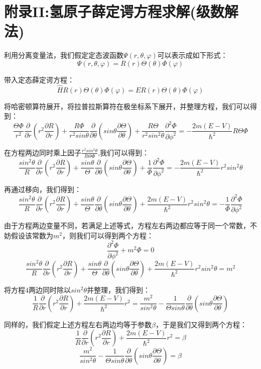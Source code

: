 \section{附录II:氢原子薛定谔方程求解(级数解法)\label{hydrgen}}
利用分离变量法，我们假定定态波函数$\varPsi(r,\theta,\varphi)$可以表示成如下形式：
\[\varPsi(r,\theta,\varphi)=R(r)\Theta(\theta)\varPhi(\varphi)\]

带入定态薛定谔方程：
\[\hat{H}R(r)\Theta(\theta)\varPhi(\varphi)=ER(r)\Theta(\theta)\varPhi(\varphi)\]

将哈密顿算符展开，将拉普拉斯算符在极坐标系下展开，并整理方程，我们可以得到：
\[\frac{\Theta\varPhi}{r^2}\frac{\partial}{\partial{r}}(r^2\frac{\partial R}{\partial{r}})+\frac{R\varPhi}{r^2sin\theta}\frac{\partial}{\partial{\theta}}(sin\theta\frac{\partial \Theta}{\partial{\theta}})+\frac{R\Theta}{r^2sin^2 \theta }\frac{\partial^2 \varPhi}{\partial{\phi^2}}=-\frac{2m(E-V)}{\hbar^2}R\Theta\varPhi\]

在方程两边同时乘上因子$\frac{r^2sin^2 \theta}{R\Theta\varPhi}$,我们可以得到：
\[\frac{sin^2 \theta}{R}\frac{\partial}{\partial{r}}(r^2\frac{\partial R}{\partial{r}})+\frac{sin\theta}{\Theta}\frac{\partial}{\partial{\theta}}(sin\theta\frac{\partial \Theta}{\partial{\theta}})+\frac{1}{\varPhi}\frac{\partial^2 \varPhi}{\partial{\phi^2}}=-\frac{2m(E-V)}{\hbar^2}r^2sin^2 \theta\]

再通过移向，我们得到：
\[\frac{sin^2 \theta}{R}\frac{\partial}{\partial{r}}(r^2\frac{\partial R}{\partial{r}})+\frac{sin\theta}{\Theta}\frac{\partial}{\partial{\theta}}(sin\theta\frac{\partial \Theta}{\partial{\theta}})+\frac{2m(E-V)}{\hbar^2}r^2sin^2 \theta=-\frac{1}{\varPhi}\frac{\partial^2 \varPhi}{\partial{\phi^2}}\]

由于方程两边变量不同，若满足上述等式，方程左右两边都应等于同一个常数，不妨假设该常数为$m^2$，则我们可以得到两个方程：
\[\frac{\partial^2 \varPhi}{\partial{\phi^2}}+m^2\varPhi=0 \tag{a}\]
\[\frac{sin^2 \theta}{R}\frac{\partial}{\partial{r}}(r^2\frac{\partial R}{\partial{r}})+\frac{sin\theta}{\Theta}\frac{\partial}{\partial{\theta}}(sin\theta\frac{\partial \Theta}{\partial{\theta}})+\frac{2m(E-V)}{\hbar^2}r^2sin^2 \theta=m^2 \tag{4}\]

将方程$4$两边同时除以$sin^2 \theta$并整理，我们得到：
\[\frac{1}{R}\frac{\partial}{\partial{r}}(r^2\frac{\partial R}{\partial{r}})+\frac{2m(E-V)}{\hbar^2}r^2=\frac{m^2}{sin^2 \theta}-\frac{1}{\Theta sin\theta}\frac{\partial}{\partial{\theta}}(sin\theta\frac{\partial \Theta}{\partial{\theta}})\]

同样的，我们假定上述方程左右两边均等于参数$\beta$，于是我们又得到两个方程：
\[\frac{1}{R}\frac{\partial}{\partial{r}}(r^2\frac{\partial R}{\partial{r}})+\frac{2m(E-V)}{\hbar^2}r^2=\beta \tag{b}\]
\[\frac{m^2}{sin^2 \theta}-\frac{1}{\Theta sin\theta}\frac{\partial}{\partial{\theta}}(sin\theta\frac{\partial \Theta}{\partial{\theta}})=\beta \tag{c}\]

